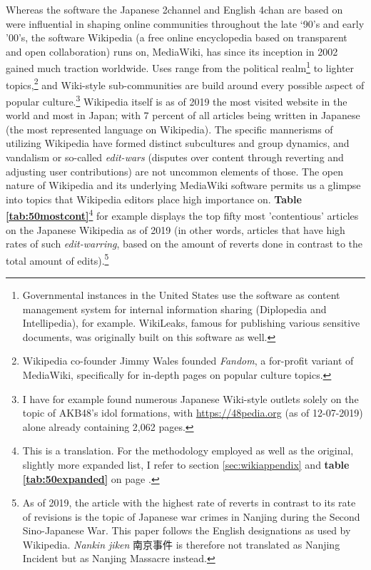\documentclass[10pt,british,A4paper,,openany]{memoir}
\begin{document}
Whereas the software the Japanese 2channel and English 4chan are based
on were influential in shaping online communities throughout the late
`90's and early '00's, the software Wikipedia (a free online
encyclopedia based on transparent and open collaboration) runs on,
MediaWiki, has since its inception in 2002 gained much traction
worldwide. Uses range from the political realm\footnote{Governmental
  instances in the United States use the software as content management
  system for internal information sharing (Diplopedia and Intellipedia),
  for example. WikiLeaks, famous for publishing various sensitive
  documents, was originally built on this software as well.} to lighter
topics,\footnote{Wikipedia co-founder Jimmy Wales founded \emph{Fandom},
  a for-profit variant of MediaWiki, specifically for in-depth pages on
  popular culture topics.} and Wiki-style sub-communities are build
around every possible aspect of popular culture.\footnote{I have for
  example found numerous Japanese Wiki-style outlets solely on the topic
  of AKB48's idol formations, with \url{https://48pedia.org} (as of
  12-07-2019) alone already containing 2,062 pages.} Wikipedia itself is
as of 2019 the  most visited website in the world and 
most in Japan; with 7 percent of all articles being written in Japanese
(the  most represented language on Wikipedia). The specific
mannerisms of utilizing Wikipedia have formed distinct subcultures and
group dynamics, and vandalism or so-called \emph{edit-wars} (disputes
over content through reverting and adjusting user contributions) are not
uncommon elements of those. The open nature of Wikipedia and its
underlying MediaWiki software permits us a glimpse into topics that
Wikipedia editors place high importance on. \textbf{Table
\ref{tab:50mostcont}}\footnote{This is a translation. For the
  methodology employed as well as the original, slightly more expanded
  list, I refer to section \ref{sec:wikiappendix} and \textbf{table
  \ref{tab:50expanded}} on page \pageref{tab:50expanded}.} for example
displays the top fifty most 'contentious' articles on the Japanese
Wikipedia as of 2019 (in other words, articles that have high rates of
such \emph{edit-warring}, based on the amount of reverts done in
contrast to the total amount of edits).\footnote{As of 2019, the article
  with the highest rate of reverts in contrast to its rate of revisions
  is the topic of Japanese war crimes in Nanjing during the Second
  Sino-Japanese War. This paper follows the English designations as used
  by Wikipedia. \emph{Nankin jiken} 南京事件 is therefore not translated
  as Nanjing Incident but as Nanjing Massacre instead.}
\end{document}
